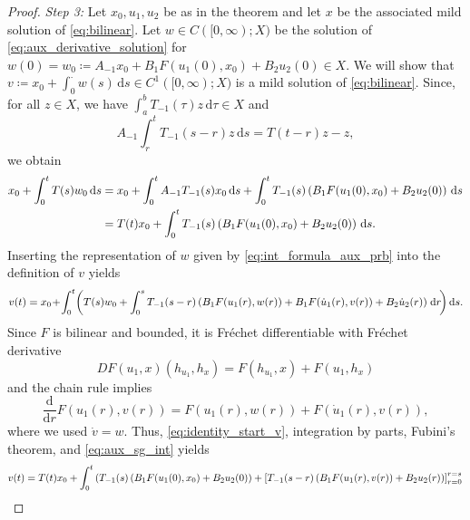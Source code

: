 \documentclass{cocv}
\renewcommand{\d}{\,\mathrm{d}}
\newcommand{\ds}{ {\, \rm d} s}
\theoremstyle{definition}
\begin{document}
\begin{proof}
    \emph{Step 3:} Let $x_0, u_1, u_2$ be as in the theorem and let $x$ be the associated mild solution of \eqref{eq:bilinear}. Let $w \in C([0,\infty);X)$ be the solution of \eqref{eq:aux_derivative_solution} for $w(0)=w_0 \coloneqq A_{-1}x_0 + B_1F(u_1(0),x_0) + B_2u_2(0) \in X$. We will show that $v \coloneqq x_0 + \int_{0}^{\cdot} w(s) \d s \in C^1([0, \infty);X)$ is a mild solution of \eqref{eq:bilinear}.
    Since, for all $z \in X$, we have $\int_a^b T_{-1}(\tau) z \d \tau \in X$ and
    \begin{equation}\label{eq:aux_sg_int}
        A_{-1} \int_r^t T_{-1}(s-r)z \d s = T(t-r)z-z,
    \end{equation}
    we obtain
    \begin{equation}\label{eq:identity_start_v}
        \begin{aligned}
            x_0 + \int_{0}^t T(s)w_0\ds 
            &= x_0 + \int_{0}^t A_{-1}T_{-1}(s)x_0 \ds + \int_{0}^t T_{-1}(s) \left(B_1F(u_1(0),x_0) + B_2u_2(0)\right) \ds\\
            &= T(t)x_0 + \int_{0}^t T_{-1}(s) \left(B_1F(u_1(0),x_0) + B_2u_2(0) \right)\ds.
        \end{aligned}
    \end{equation}
    Inserting the representation of $w$ given by \eqref{eq:int_formula_aux_prb} into the definition of $v$ yields
    \begin{equation*}
        v(t) = x_0 \!+\! \int_{0}^t\! \left(T(s)w_0 +  \int_{0}^s T_{-1}(s-r)\left(B_1F(u_1(r),w(r)) + B_1F(\dot u_1(r),v(r)) + B_2 \dot u_2(r)\right)\!\!\;\d r\!\right)\! \ds.
    \end{equation*}
    Since $F$ is bilinear and bounded, it is Fr\'echet differentiable with Fr\'echet derivative
    \begin{equation*}
        DF(u_1,x)(h_{u_1},h_x) = F(h_{u_1},x) + F(u_1,h_x)
    \end{equation*}
    and the chain rule implies
    \begin{equation*}
    \frac{\mathrm{d}}{\mathrm{d}r} F(u_1(r),v(r)) = F(u_1(r), w(r)) + F(\dot u_1(r), v(r)),
    \end{equation*}
    where we used $\dot v = w$.
    Thus, \eqref{eq:identity_start_v}, integration by parts, Fubini's theorem, and \eqref{eq:aux_sg_int} yields
    \begin{align}\label{eq:x_0+y(t)}
        v(t) &= T(t)x_0 + \int_{0}^t \left(T_{-1}(s) \left(B_1F(u_1(0),x_0) + B_2u_2(0) \right) + \left[T_{-1}(s-r)\left(B_1F(u_1(r),v(r)) + B_2u_2(r)\right)\right]^{r=s}_{r=0} \right. \notag \\

\end{align}
\end{proof}
\end{document}
